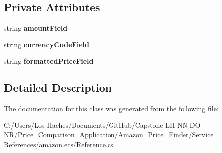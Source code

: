 \subsection*{Private Attributes}
\begin{DoxyCompactItemize}
\item 
\hypertarget{class_price___comparison_1_1amazon_1_1ecs_1_1_price_aa3bccdc3d7a2e593ec9d3bdffa4bfc2f}{string {\bfseries amount\-Field}}\label{class_price___comparison_1_1amazon_1_1ecs_1_1_price_aa3bccdc3d7a2e593ec9d3bdffa4bfc2f}

\item 
\hypertarget{class_price___comparison_1_1amazon_1_1ecs_1_1_price_a15c503513cddcce4f2729ffd7742b525}{string {\bfseries currency\-Code\-Field}}\label{class_price___comparison_1_1amazon_1_1ecs_1_1_price_a15c503513cddcce4f2729ffd7742b525}

\item 
\hypertarget{class_price___comparison_1_1amazon_1_1ecs_1_1_price_a9c891cf2859e349d869f3be4960cc431}{string {\bfseries formatted\-Price\-Field}}\label{class_price___comparison_1_1amazon_1_1ecs_1_1_price_a9c891cf2859e349d869f3be4960cc431}

\end{DoxyCompactItemize}


\subsection{Detailed Description}


The documentation for this class was generated from the following file\-:\begin{DoxyCompactItemize}
\item 
C\-:/\-Users/\-Los Haches/\-Documents/\-Git\-Hub/\-Capstone-\/\-L\-H-\/\-N\-N-\/\-D\-O-\/\-N\-R/\-Price\-\_\-\-Comparison\-\_\-\-Application/\-Amazon\-\_\-\-Price\-\_\-\-Finder/\-Service References/amazon.\-ecs/Reference.\-cs\end{DoxyCompactItemize}
